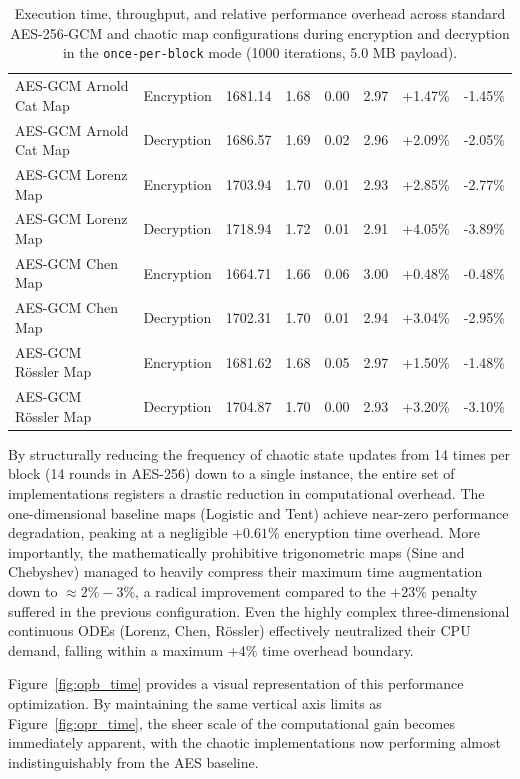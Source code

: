 \documentclass[11pt,a4paper]{report}
\begin{document}
\begin{table}[htbp]
{\begin{tabular}{llcccccc}
        AES-GCM Arnold Cat Map   & Encryption & 1681.14 & 1.68 & 0.00 & 2.97 &  +1.47\% &  -1.45\% \\
        AES-GCM Arnold Cat Map   & Decryption & 1686.57 & 1.69 & 0.02 & 2.96 &  +2.09\% &  -2.05\% \\ \midrule
        AES-GCM Lorenz Map       & Encryption & 1703.94 & 1.70 & 0.01 & 2.93 &  +2.85\% &  -2.77\% \\
        AES-GCM Lorenz Map       & Decryption & 1718.94 & 1.72 & 0.01 & 2.91 &  +4.05\% &  -3.89\% \\ \midrule
        AES-GCM Chen Map         & Encryption & 1664.71 & 1.66 & 0.06 & 3.00 &  +0.48\% &  -0.48\% \\
        AES-GCM Chen Map         & Decryption & 1702.31 & 1.70 & 0.01 & 2.94 &  +3.04\% &  -2.95\% \\ \midrule
        AES-GCM R\"ossler Map    & Encryption & 1681.62 & 1.68 & 0.05 & 2.97 &  +1.50\% &  -1.48\% \\
        AES-GCM R\"ossler Map    & Decryption & 1704.87 & 1.70 & 0.00 & 2.93 &  +3.20\% &  -3.10\% \\
        \bottomrule
    \end{tabular}%
    }
    \caption{Execution time, throughput, and relative performance overhead across standard AES-256-GCM and chaotic map configurations during encryption and decryption in the \texttt{once-per-block} mode (1000 iterations, 5.0 MB payload).}
    \label{tab:table_opb}
\end{table}

By structurally reducing the frequency of chaotic state updates from 14 times per block (14 rounds in AES-256) down to a single instance, the entire set of implementations registers a drastic reduction in computational overhead. 
The one-dimensional baseline maps (Logistic and Tent) achieve near-zero performance degradation, peaking at a negligible $+0.61\%$ encryption time overhead. 
More importantly, the mathematically prohibitive trigonometric maps (Sine and Chebyshev) managed to heavily compress their maximum time augmentation down to $\approx 2\% - 3\%$, a radical improvement compared to the $+23\%$ penalty suffered in the previous configuration. 
Even the highly complex three-dimensional continuous ODEs (Lorenz, Chen, Rössler) effectively neutralized their CPU demand, falling within a maximum $+4\%$ time overhead boundary.

Figure~\ref{fig:opb_time} provides a visual representation of this performance optimization. 
By maintaining the same vertical axis limits as Figure~\ref{fig:opr_time}, the sheer scale of the computational gain becomes immediately apparent, with the chaotic implementations now performing almost indistinguishably from the AES baseline.
\end{document}
